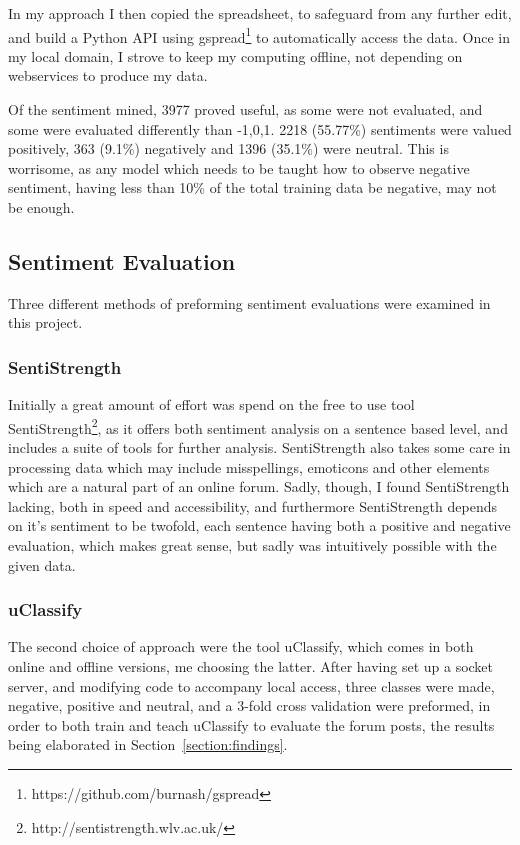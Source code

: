 \documentclass{sig-alternate}
\begin{document}
In my approach I then copied the spreadsheet, to safeguard from any further edit, and build a Python API using gspread\footnote{https://github.com/burnash/gspread} to automatically access the data. Once in my local domain, I strove to keep my computing offline, not depending on webservices to produce my data.

Of the sentiment mined, 3977 proved useful, as some were not evaluated, and some were evaluated differently than -1,0,1. 2218  (55.77\%) sentiments were valued positively, 363 (9.1\%) negatively and 1396 (35.1\%) were neutral. This is worrisome, as any model which needs to be taught how to observe negative sentiment, having less than 10\% of the total training data be negative, may not be enough.
\subsection{Sentiment Evaluation}
Three different methods of preforming sentiment evaluations were examined in this project.
\subsubsection{SentiStrength}
Initially a great amount of effort was spend on the free to use tool SentiStrength\footnote{http://sentistrength.wlv.ac.uk/}, as it offers both sentiment analysis on a sentence based level, and includes a suite of tools for further analysis. SentiStrength also takes some care in processing data which may include misspellings, emoticons and other elements which are a natural part of an online forum. Sadly, though, I found SentiStrength lacking, both in speed and accessibility, and furthermore SentiStrength depends on it's sentiment to be twofold, each sentence having both a positive and negative evaluation, which makes great sense, but sadly was intuitively possible with the given data. 
\subsubsection{uClassify}
\label{sec:uClassify}
The second choice of approach were the tool uClassify\cite{uClassify}, which comes in both online and offline versions, me choosing the latter. After having set up a socket server, and modifying code to accompany local access, three classes were made, negative, positive and neutral, and a 3-fold cross validation were preformed, in order to both train  and teach uClassify to evaluate the forum posts, the results being elaborated in Section~\ref{section:findings}.
\end{document}
